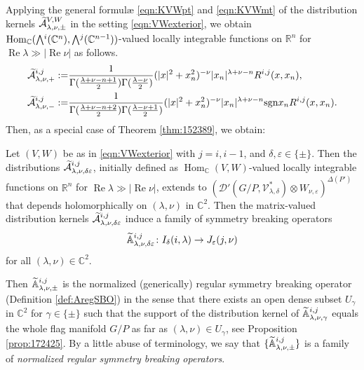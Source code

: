 \medskip
Applying the general formul{\ae} \eqref{eqn:KVWpt} and \eqref{eqn:KVWmt}
 of the distribution kernels 
 $\widetilde{{\mathcal{A}}}_{{\lambda},{\nu},{\pm}}^{{V,W}}$
 in the setting \eqref{eqn:VWexterior}, 
 we obtain 
$
    {\operatorname{Hom}}_{\mathbb{C}}
    (\Exterior^i({\mathbb{C}}^n),\Exterior^j({\mathbb{C}}^{n-1}))
$-valued locally integrable functions
 on ${\mathbb{R}}^n$
 for $\operatorname{Re}\lambda \gg |\operatorname{Re} \nu|$
 as follows.  
\begin{align}
\widetilde{{\mathcal{A}}}_{{\lambda},{\nu},{+}}^{{i,j}}
 :=&
\frac{1}{\Gamma(\frac{\lambda + \nu -n +1}{2})
         \Gamma(\frac{\lambda-\nu}{2})}
(|x|^2+ x_n^2)^{-\nu}
|x_n|^{\lambda+\nu-n}
R^{{i},{j}} (x,x_n), 
\label{eqn:Kijtilde}
\\
\widetilde{{\mathcal{A}}}_{{\lambda},{\nu},{-}}^{{i,j}}
 :=&
\frac{1}{\Gamma(\frac{\lambda + \nu -n +2}{2})
         \Gamma(\frac{\lambda-\nu+1}{2})}
(|x|^2 +x_n^2)^{-\nu}
|x_n|^{\lambda+\nu-n}
 {\operatorname{sgn}} x_n
R^{{i},{j}}(x,x_n).  
\label{eqn:Kijpmtilde}
\end{align}
Then, 
 as a special case
 of Theorem \ref{thm:152389}, 
 we obtain:
\begin{theorem}
\label{thm:1522a}
Let $(V,W)$ be as in \eqref{eqn:VWexterior}
 with $j=i,i-1$, 
 and $\delta, \varepsilon \in \{\pm \}$.  
Then the distributions $\widetilde{{\mathcal{A}}}_{{\lambda},{\nu},{\delta\varepsilon}}^{{i,j}}$, 
 initially defined as ${\operatorname{Hom}}_{\mathbb{C}}(V,W)$-valued 
 locally integrable functions
 on ${\mathbb{R}}^n$ 
 for $\operatorname{Re}\lambda \gg |\operatorname{Re} \nu|$, 
 extends to 
$
   ({\mathcal{D}}'(G/P, {\mathcal{V}}_{\lambda,\delta}^{\ast}) \otimes W_{\nu,\varepsilon})^{\Delta(P')}
$
 that depends holomorphically on $(\lambda, \nu)$
 in ${\mathbb{C}}^2$.  
Then the matrix-valued distribution kernels
$
\widetilde{{\mathcal{A}}}_{{\lambda},{\nu},{\delta\varepsilon}}^{{i,j}}
$
 induce a family of symmetry breaking operators
\begin{equation}
\label{eqn:Aijdef}
  {\widetilde{\mathbb{A}}}_{{\lambda},{\nu},{\delta\varepsilon}}^{{i,j}}
  \colon
  I_{\delta}(i,\lambda) \to J_{\varepsilon}(j,\nu)
\end{equation}
 for all $(\lambda, \nu) \in {\mathbb{C}}^2$.  
\end{theorem}

Then ${\widetilde{\mathbb{A}}}_{{\lambda},{\nu},{\pm}}^{{i,j}}$ is the normalized (generically) regular 
 symmetry breaking operator (Definition \ref{def:AregSBO})
 in the sense that there exists an open dense subset
 $U_{\gamma}$ in ${\mathbb{C}}^2$
 for $\gamma \in \{\pm\}$
 such that the support of the distribution kernel 
 of ${\widetilde{\mathbb{A}}}_{{\lambda},{\nu},{\gamma}}^{{i,j}}$ equals 
 the whole flag manifold $G/P$
 as far as $(\lambda,\nu) \in U_{\gamma}$, 
 see Proposition \ref{prop:172425}.  
By a little abuse of terminology,
 we say that $\{{\widetilde{\mathbb{A}}}_{{\lambda},{\nu},{\pm}}^{{i,j}}\}$
 is a family of 
 {\it{normalized regular symmetry breaking operators}}.  



